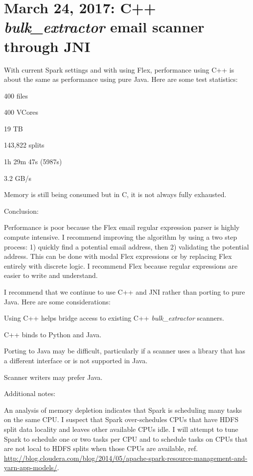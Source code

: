 \documentclass[12pt,twoside]{article}
\newcommand \bulk {\textit{bulk\_extractor}\xspace}
\begin{document}
\section{March 24, 2017: C++ \bulk email scanner through JNI}
With current Spark settings and with using Flex, performance using C++ is about the same as performance using pure Java. Here are some test statistics:
\begin{compactitem}
\item 400 files
\item 400 VCores
\item 19 TB
\item 143,822 splits
\item 1h 29m 47s (5987s)
\item 3.2 GB/s
\item Memory is still being consumed but in C, it is not always fully exhausted.
\end{compactitem}

Conclusion:
\begin{compactitem}
\item Performance is poor because the Flex email regular expression parser is highly compute intensive. I recommend improving the algorithm by using a two step process: 1) quickly find a potential email address, then 2) validating the potential address. This can be done with modal Flex expressions or by replacing Flex entirely with discrete logic. I recommend Flex because regular expressions are easier to write and understand.
\item I recommend that we continue to use C++ and JNI rather than porting to pure Java.  Here are some considerations:
  \begin{compactitem}
  \item Using C++ helps bridge access to existing C++ \bulk scanners.
  \item C++ binds to Python and Java.
  \item Porting to Java may be difficult, particularly if a scanner uses a library that has a different interface or is not supported in Java.
  \item Scanner writers may prefer Java.
  \end{compactitem}
\end{compactitem}

Additional notes:
\begin{compactitem}
\item An analysis of memory depletion indicates that Spark is scheduling many tasks on the same CPU. I suspect that Spark over-schedules CPUs that have HDFS split data locality and leaves other available CPUs idle. I will attempt to tune Spark to schedule one or two tasks per CPU and to schedule tasks on CPUs that are not local to HDFS splits when those CPUs are available, ref. \url{http://blog.cloudera.com/blog/2014/05/apache-spark-resource-management-and-yarn-app-models/}.
\end{compactitem}
\end{document}
